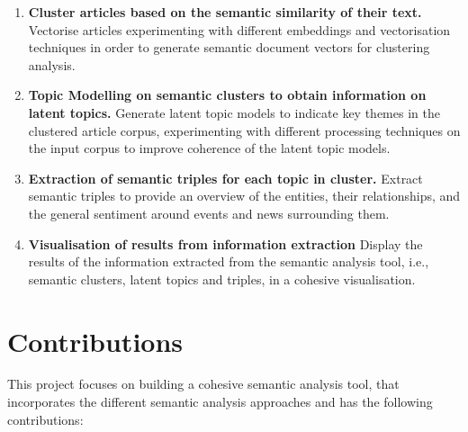 \begin{enumerate}
    \item \textbf{Cluster articles based on the semantic similarity of their text.} Vectorise articles experimenting with different embeddings and vectorisation techniques in order to generate semantic document vectors for clustering analysis. 

    \item \textbf{Topic Modelling on semantic clusters to obtain information on latent topics.} Generate latent topic models to indicate key themes in the clustered article corpus, experimenting with different processing techniques on the input corpus to improve coherence of the latent topic models.

    \item \textbf{Extraction of semantic triples for each topic in cluster.} Extract semantic triples to provide an overview of the entities, their relationships, and the general sentiment around events and news surrounding them.

    \item \textbf{Visualisation of results from information extraction} Display the results of the information extracted from the semantic analysis tool, i.e., semantic clusters, latent topics and triples, in a cohesive visualisation.  
    
\end{enumerate}

\section{Contributions} \label{contributions}

This project focuses on building a cohesive semantic analysis tool, that incorporates the different semantic analysis approaches and has the following contributions: 
 
